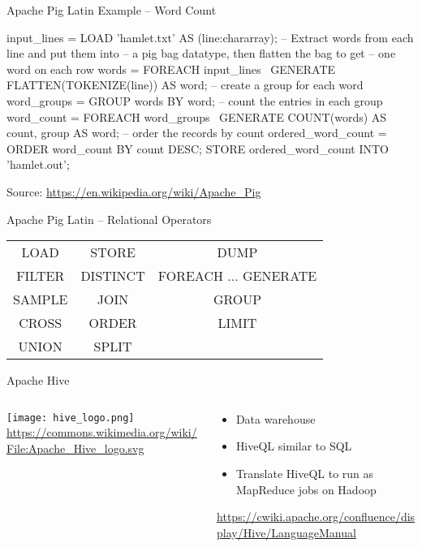 \documentclass[ignorenonframetext,xcolor=x11names]{beamer}
\begin{document}
\begin{frame}[fragile]{Apache Pig Latin Example -- Word Count}
\begin{sqlcode}
input_lines = LOAD 'hamlet.txt' AS (line:chararray);
-- Extract words from each line and put them into 
-- a pig bag datatype, then flatten the bag to get
-- one word on each row
words = FOREACH input_lines \
   GENERATE FLATTEN(TOKENIZE(line)) AS word;
-- create a group for each word
word_groups = GROUP words BY word;
-- count the entries in each group
word_count = FOREACH word_groups  \
   GENERATE COUNT(words) AS count, group AS word;
-- order the records by count
ordered_word_count = ORDER word_count BY count DESC;
STORE ordered_word_count INTO 'hamlet.out';
\end{sqlcode}
\small Source: \url{https://en.wikipedia.org/wiki/Apache_Pig}
\end{frame}

\begin{frame}{Apache Pig Latin -- Relational Operators}
\renewcommand{\arraystretch}{1.5}

\begin{tabular}{ccc} 
LOAD & STORE & DUMP \\
FILTER & DISTINCT & FOREACH $\ldots$ GENERATE \\
SAMPLE & JOIN & GROUP  \\
CROSS & ORDER & LIMIT  \\
UNION & SPLIT \\
\end{tabular}
\end{frame}

\begin{frame}{Apache Hive}
\begin{columns}
\begin{column}{.4\textwidth}
\centering
\texttt{[image: hive\_logo.png]} \\
\tiny\url{https://commons.wikimedia.org/wiki/File:Apache_Hive_logo.svg}
\end{column}
\begin{column}{.6\textwidth}
\begin{itemize}
   \item Data warehouse
   \item HiveQL similar to SQL
   \item Translate HiveQL to run as MapReduce jobs on Hadoop
\end{itemize}

\vspace{\baselineskip}
\url{https://cwiki.apache.org/confluence/display/Hive/LanguageManual}
\end{column}
\end{columns}
\end{frame}
\end{document}
